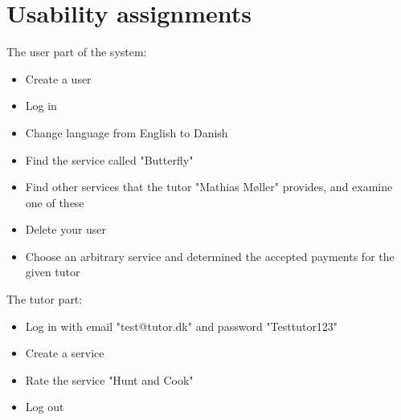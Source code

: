 \section{Usability assignments}\label{app:usability}
The user part of the system:
\begin{itemize}
    \item Create a user
    \item Log in
    \item Change language from English to Danish
    \item Find the service called "Butterfly"
    \item Find other services that the tutor "Mathias Møller" provides, and examine one of these
    \item Delete your user
    \item Choose an arbitrary service and determined the accepted payments for the given tutor
\end{itemize}

The tutor part:
\begin{itemize}
    \item Log in with email "test@tutor.dk" and password "Testtutor123"
    \item Create a service
    \item Rate the service "Hunt and Cook"
    \item Log out
\end{itemize}

